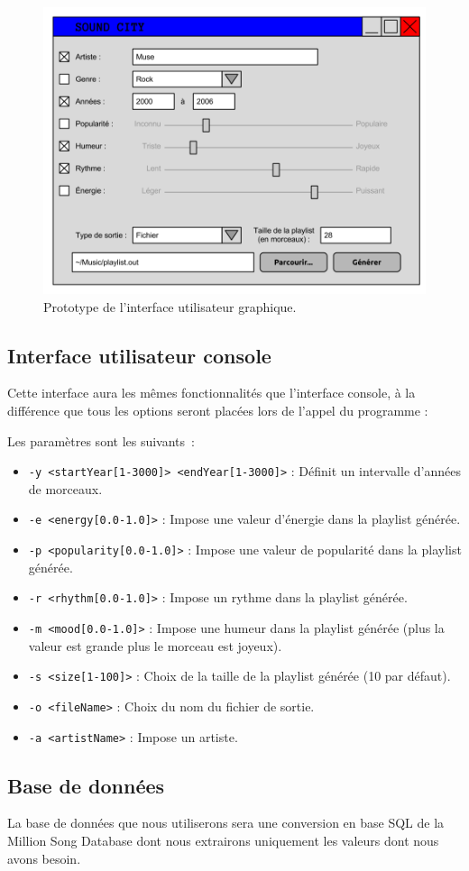 \begin{figure}[H]
\includegraphics[width=\textwidth]{data/besoins/interface_utilisateur.png}
\caption{Prototype de l'interface utilisateur graphique.}
\end{figure}

\subsection{Interface utilisateur console}
\label{besoins:proto:console}

Cette interface aura les mêmes fonctionnalités que l'interface console, à la différence que tous les options seront placées lors de l'appel du programme :

\vspace{3mm}
\noindent Les paramètres sont les suivants~:
\begin{itemize}
\item \texttt{-y <startYear[1-3000]> <endYear[1-3000]>} : Définit un intervalle 
d'années de morceaux.
\item \texttt{-e <energy[0.0-1.0]>} : Impose une valeur d'énergie dans 
la playlist générée.
\item \texttt{-p <popularity[0.0-1.0]>} : Impose une valeur de popularité 
dans la playlist générée.
\item \texttt{-r <rhythm[0.0-1.0]>} : Impose un rythme dans la 
playlist générée.
\item \texttt{-m <mood[0.0-1.0]>} : Impose une humeur dans la 
playlist générée (plus la valeur est grande plus le morceau est joyeux).
\item \texttt{-s <size[1-100]>} : Choix de la taille de la 
playlist générée (10 par défaut).
\item \texttt{-o <fileName>} : Choix du nom du fichier de sortie.
\item \texttt{-a <artistName>} : Impose un artiste.
\end{itemize}

\subsection{Base de données}
\label{besoins:proto:bdd}

La base de données que nous utiliserons sera une conversion en base SQL de la Million Song Database dont nous extrairons uniquement les valeurs dont nous avons besoin.
